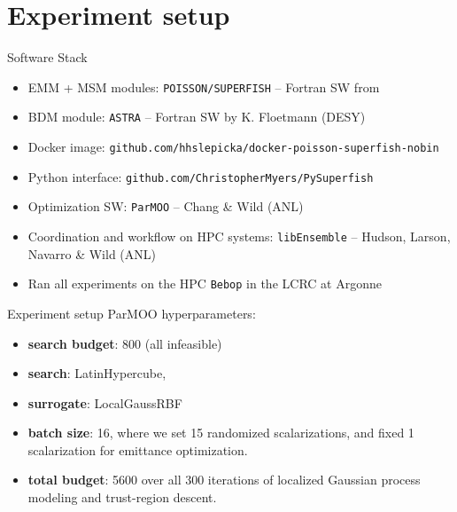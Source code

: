 \documentclass[aspectratio=169]{beamer}
\begin{document}
\section{Experiment setup}

\begin{frame}{Software Stack}
\begin{itemize}
    \item EMM + MSM modules: {\tt POISSON/SUPERFISH} -- Fortran SW from 
    \item BDM module: {\tt ASTRA} -- Fortran SW by K. Floetmann (DESY)
    \item Docker image: {\tt github.com/hhslepicka/docker-poisson-superfish-nobin}
    \item Python interface: {\tt github.com/ChristopherMyers/PySuperfish}
    \pause
    \item Optimization SW: {\tt ParMOO} -- Chang \& Wild (ANL)
    \pause
    \item Coordination and workflow on HPC systems: {\tt libEnsemble} -- Hudson, Larson, Navarro \& Wild (ANL)
    \pause
    \item Ran all experiments on the HPC {\tt Bebop} in the LCRC at Argonne
\end{itemize}
\end{frame}

\begin{frame}{Experiment setup}
ParMOO hyperparameters: 

\begin{itemize}
    \item[] \textbf{search budget}: 800 (all infeasible)
    \item[] \textbf{search}: LatinHypercube,
    \item[] \textbf{surrogate}: LocalGaussRBF
    \item[] \textbf{batch size}: 16, where we set 15 randomized scalarizations, and fixed 1 scalarization for emittance optimization.
    \item[] \textbf{total budget}: 5600 over all 300 iterations of localized Gaussian process modeling and trust-region descent.
\end{itemize}
\end{frame}
\end{document}
